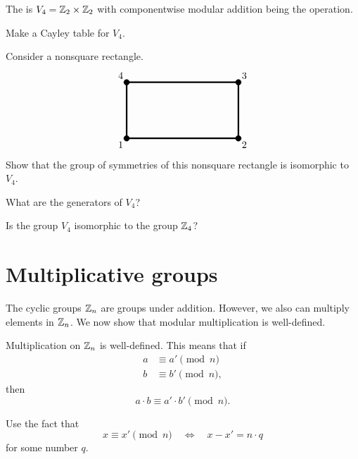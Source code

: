 \documentclass{ximera}
\begin{document}
\begin{definition}
  The  is $V_4 = \mathbb Z_2\times\mathbb Z_2$ with
  componentwise modular addition being the operation.
\end{definition}

\begin{exercise}
  Make a Cayley table for $V_4$.
\end{exercise}


\begin{exercise}
  Consider a nonsquare rectangle. 
  \[ 
  \begin{tikzpicture}
    \draw[ultra thick,rounded corners=.05mm] (0,0) -- (4,0) -- (4,2) -- (0,2)-- cycle;
    \draw[fill] (0,0) circle (1mm) node[below left] {$1$};
    \draw[fill] (4,0) circle (1mm) node[below right] {$2$};
    \draw[fill] (4,2) circle (1mm) node[above right] {$3$};
    \draw[fill] (0,2) circle (1mm) node[above left] {$4$};
  \end{tikzpicture}
  \]
  Show that the group of symmetries of this nonsquare rectangle is
  isomorphic to $V_4$.
\end{exercise}


\begin{exercise}
  What are the generators of $V_4$?
\end{exercise}

\begin{exercise}
  Is the group $V_4$ isomorphic to the group $\mathbb Z_4$?
\end{exercise}



\section{Multiplicative groups}


The cyclic groups $\mathbb Z_n$ are groups under addition. However, we also
can multiply elements in $\mathbb Z_n$. We now show that modular
multiplication is well-defined.

\begin{lemma}\label{L:mmwd}
  Multiplication on $\mathbb Z_n$ is well-defined. This means that if
  \begin{align*}
    a &\equiv a' \pmod{n}\\
    b &\equiv b' \pmod{n},
  \end{align*}
  then
  \[
  a\cdot b \equiv a'\cdot b' \pmod{n}.
  \]
  \begin{sketch}
    Use the fact that
    \[
    x \equiv x'\pmod{n} \quad \Leftrightarrow \quad x -x' = n\cdot q
    \]
    for some number $q$.
  \end{sketch}
\end{lemma}
\end{document}
